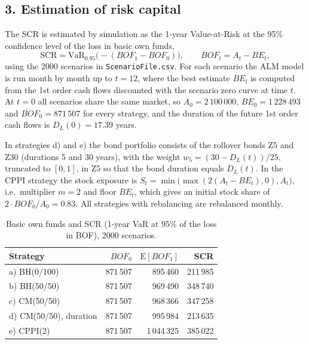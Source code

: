 
\subsection*{3. Estimation of risk capital}

The SCR is estimated by simulation as the 1-year Value-at-Risk at the 95\% confidence level of the
loss in basic own funds,
\begin{equation*}
  \mathrm{SCR} = \mathrm{VaR}_{0.95}\bigl(-(BOF_1 - BOF_0)\bigr), \qquad BOF_t = A_t - BE_t ,
\end{equation*}
using the 2000 scenarios in \texttt{ScenarioFile.csv}. For each scenario the ALM model is run month by
month up to $t = 12$, where the best estimate $BE_t$ is computed from the 1st order cash flows
discounted with the scenario zero curve at time $t$. At $t = 0$ all scenarios share the same market,
so $A_0 = 2\,100\,000$, $BE_0 = 1\,228\,493$ and $BOF_0 = 871\,507$ for every strategy, and the
duration of the future 1st order cash flows is $D_L(0) = 17.39$ years.

In strategies d) and e) the bond portfolio consists of the rollover bonds Z5 and Z30 (durations 5 and
30 years), with the weight $w_5 = (30 - D_L(t))/25$, truncated to $[0, 1]$, in Z5 so that the bond
duration equals $D_L(t)$. In the CPPI strategy the stock exposure is
$S_t = \min\bigl(\max(2(A_t - BE_t), 0), A_t\bigr)$, i.e.\ multiplier $m = 2$ and floor $BE_t$, which
gives an initial stock share of $2 \cdot BOF_0 / A_0 = 0.83$. All strategies with rebalancing are
rebalanced monthly.

\begin{table}[htbp]
  \centering
  \caption{Basic own funds and SCR (1-year VaR at 95\% of the loss in BOF), 2000 scenarios.}
  \label{tab:q3_scr}
  \begin{tabular}{lrrr}
    \toprule
    Strategy & $BOF_0$ & $\mathrm{E}[BOF_1]$ & SCR \\
    \midrule
    a) BH(0/100)            & 871\,507 &   895\,460 & 211\,985 \\
    b) BH(50/50)            & 871\,507 &   969\,490 & 348\,740 \\
    c) CM(50/50)            & 871\,507 &   968\,366 & 347\,258 \\
    d) CM(50/50), duration  & 871\,507 &   995\,984 & 213\,635 \\
    e) CPPI(2)              & 871\,507 & 1\,044\,325 & 385\,022 \\
    \bottomrule
  \end{tabular}
\end{table}

